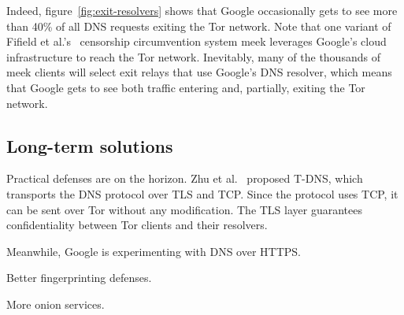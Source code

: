 Indeed, figure~\ref{fig:exit-resolvers} shows that Google occasionally gets to see more
than 40\% of all DNS requests exiting the Tor network.
Note that one variant of Fifield et al.'s~\cite{Fifield2015a} censorship
circumvention system meek leverages Google's cloud infrastructure to reach the
Tor network.  Inevitably, many of the thousands of meek clients will select
exit relays that use Google's DNS resolver, which means that Google gets to see
both traffic entering and, partially, exiting the Tor network.


\subsection{Long-term solutions}

Practical defenses are on the horizon.  Zhu et al.~\cite{Zhu2015a} proposed
T-DNS, which transports the DNS protocol over TLS and TCP.  Since the protocol
uses TCP, it can be sent over Tor without any modification.  The TLS layer
guarantees confidentiality between Tor clients and their resolvers.

Meanwhile, Google is experimenting with DNS over HTTPS.


Better fingerprinting defenses.

More onion services.
